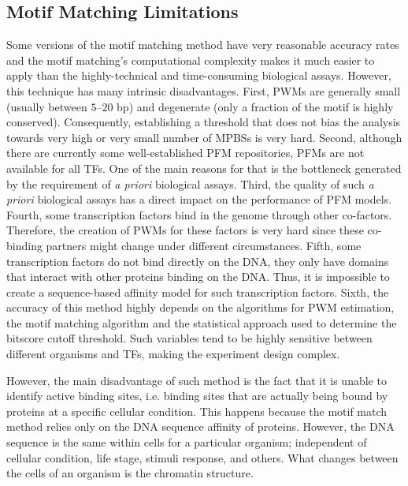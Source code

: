 \subsection{Motif Matching Limitations}
\label{sec:motif.matching.limitations}

Some versions of the motif matching method have very reasonable accuracy rates and the motif matching's computational complexity makes it much easier to apply than the highly-technical and time-consuming biological assays. However, this technique has many intrinsic disadvantages. First, PWMs are generally small (usually between $5$--$20$ bp) and degenerate (only a fraction of the motif is highly conserved). Consequently, establishing a threshold that does not bias the analysis towards very high or very small number of MPBSs is very hard. Second, although there are currently some well-established PFM repositories, PFMs are not available for all TFs. One of the main reasons for that is the bottleneck generated by the requirement of \emph{a priori} biological assays. Third, the quality of such \emph{a priori} biological assays has a direct impact on the performance of PFM models. Fourth, some transcription factors bind in the genome through other co-factors. Therefore, the creation of PWMs for these factors is very hard since these co-binding partners might change under different circumstances. Fifth, some transcription factors do not bind directly on the DNA, they only have domains that interact with other proteins binding on the DNA. Thus, it is impossible to create a sequence-based affinity model for such transcription factors. Sixth, the accuracy of this method highly depends on the algorithms for PWM estimation, the motif matching algorithm and the statistical approach used to determine the bitscore cutoff threshold. Such variables tend to be highly sensitive between different organisms and TFs, making the experiment design complex.

However, the main disadvantage of such method is the fact that it is unable to identify active binding sites, i.e. binding sites that are actually being bound by proteins at a specific cellular condition. This happens because the motif match method relies only on the DNA sequence affinity of proteins. However, the DNA sequence is the same within cells for a particular organism; independent of cellular condition, life stage, stimuli response, and others. What changes between the cells of an organism is the chromatin structure.

